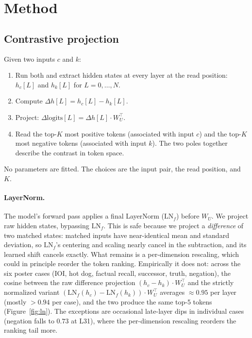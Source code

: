\documentclass[11pt]{article}
\newcommand{\dhh}{\Delta h}
\newcommand{\WU}{W_U}
\begin{document}
\section{Method}

\subsection{Contrastive projection}

Given two inputs $c$ and $k$:

\begin{enumerate}[leftmargin=*]
\item Run both and extract hidden states at every layer at the read position:
   $h_c[L]$ and $h_k[L]$ for $L = 0, \dots, N$.
\item Compute $\dhh[L] = h_c[L] - h_k[L]$.
\item Project: $\Delta\text{logits}[L] = \dhh[L] \cdot \WU^\top$.
\item Read the top-$K$ most positive tokens (associated with input $c$) and the
   top-$K$ most negative tokens (associated with input $k$). The two poles
   together describe the contrast in token space.
\end{enumerate}

No parameters are fitted. The choices are the input pair, the read position, and $K$.

\paragraph{LayerNorm.} The model's forward pass applies a final LayerNorm ($\text{LN}_f$) before
$\WU$. We project raw hidden states, bypassing $\text{LN}_f$. This is safe
because we project a \emph{difference} of two matched states: matched
inputs have near-identical mean and standard deviation, so $\text{LN}_f$'s
centering and scaling nearly cancel in the subtraction, and its learned
shift cancels exactly. What remains is a per-dimension rescaling, which
could in principle reorder the token ranking. Empirically it does not:
across the six poster cases (IOI, hot dog, factual recall, successor,
truth, negation), the cosine between the raw difference projection
$(h_c - h_k) \cdot \WU^\top$ and the strictly normalized variant
$(\text{LN}_f(h_c) - \text{LN}_f(h_k)) \cdot \WU^\top$ averages
$\approx 0.95$ per layer (mostly $>0.94$ per case), and the two produce
the same top-5 tokens (Figure~\ref{fig:ln}). The exceptions are
occasional late-layer dips in individual cases (negation falls to
$0.73$ at L31), where the per-dimension rescaling reorders the ranking
tail more.
\end{document}
